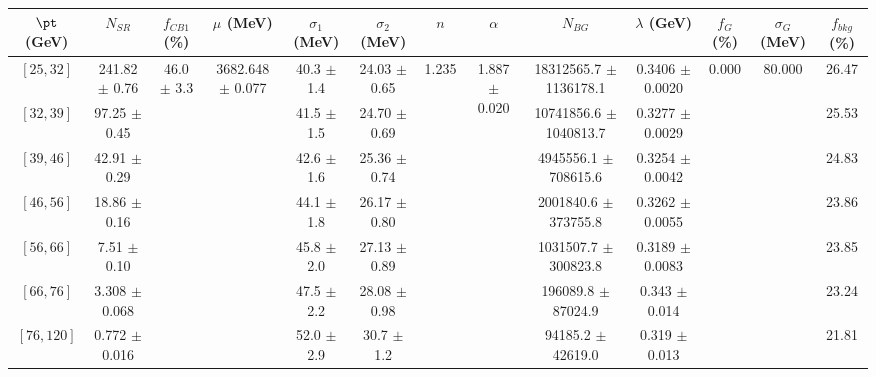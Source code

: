 \begin{tabular}{c||c|c|c|c|c|c|c|c|c|c|c||c}
$\pt$ (GeV) & $N_{SR}$ & $f_{CB1}$ (\%) & $\mu$ (MeV) & $\sigma_1$ (MeV) & $\sigma_2$ (MeV) & $n$ & $\alpha$ & $N_{BG}$ & $\lambda$ (GeV) & $f_G$ (\%) & $\sigma_G$ (MeV) & $f_{bkg}$ (\%) \\
\hline
$[25, 32]$ & 241.82 $\pm$ 0.76 & \multirow{7}{*}{46.0 $\pm$ 3.3} & \multirow{7}{*}{3682.648 $\pm$ 0.077} & 40.3 $\pm$ 1.4 & 24.03 $\pm$ 0.65 & \multirow{7}{*}{1.235} & \multirow{7}{*}{1.887 $\pm$ 0.020} & 18312565.7 $\pm$ 1136178.1 & 0.3406 $\pm$ 0.0020 & \multirow{7}{*}{0.000} & \multirow{7}{*}{80.000} & 26.47\\
$[32, 39]$ & 97.25 $\pm$ 0.45 &  &  & 41.5 $\pm$ 1.5 & 24.70 $\pm$ 0.69 &  &  & 10741856.6 $\pm$ 1040813.7 & 0.3277 $\pm$ 0.0029 &  &  & 25.53\\
$[39, 46]$ & 42.91 $\pm$ 0.29 &  &  & 42.6 $\pm$ 1.6 & 25.36 $\pm$ 0.74 &  &  & 4945556.1 $\pm$ 708615.6 & 0.3254 $\pm$ 0.0042 &  &  & 24.83\\
$[46, 56]$ & 18.86 $\pm$ 0.16 &  &  & 44.1 $\pm$ 1.8 & 26.17 $\pm$ 0.80 &  &  & 2001840.6 $\pm$ 373755.8 & 0.3262 $\pm$ 0.0055 &  &  & 23.86\\
$[56, 66]$ & 7.51 $\pm$ 0.10 &  &  & 45.8 $\pm$ 2.0 & 27.13 $\pm$ 0.89 &  &  & 1031507.7 $\pm$ 300823.8 & 0.3189 $\pm$ 0.0083 &  &  & 23.85\\
$[66, 76]$ & 3.308 $\pm$ 0.068 &  &  & 47.5 $\pm$ 2.2 & 28.08 $\pm$ 0.98 &  &  & 196089.8 $\pm$ 87024.9 & 0.343 $\pm$ 0.014 &  &  & 23.24\\
$[76, 120]$ & 0.772 $\pm$ 0.016 &  &  & 52.0 $\pm$ 2.9 & 30.7 $\pm$ 1.2 &  &  & 94185.2 $\pm$ 42619.0 & 0.319 $\pm$ 0.013 &  &  & 21.81\\
\end{tabular}
